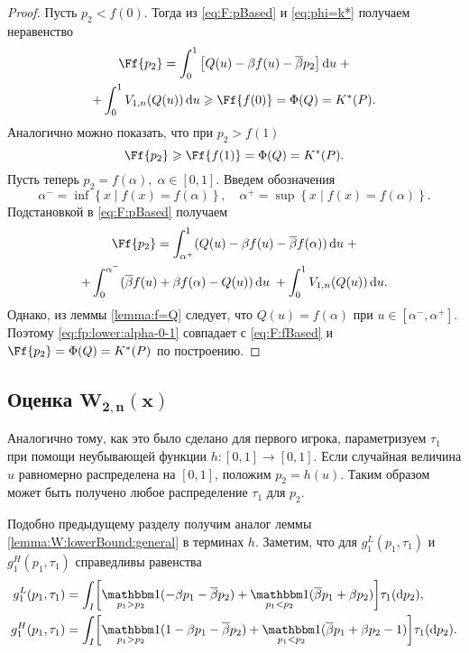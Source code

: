 {\begin{proof}
  Пусть $p_2 < f(0)$.
  Тогда из \eqref{eq:F:pBased} и \eqref{eq:phi=k*} получаем неравенство
  \begin{multline*}
    \Ff{p_2} = \int_0^1 \left[ Q(u) - \Co f(u) - \DCo p_2
    \right] \di u \; + \\
    + \int_0^1 V_{1,n}(Q(u)) \di u \geqslant \Ff{f(0)} = \Phi(Q) = K^*(P).
  \end{multline*}
  Аналогично можно показать, что при $p_2 > f(1)$
  \begin{equation*}
    \Ff{p_2} \geqslant \Ff{f(1)} = \Phi(Q) = K^*(P).
  \end{equation*}
  Пусть теперь $p_2 = f(\alpha), \; \alpha \in [0, 1]$. Введем обозначения
  \[
    \alpha^- = \inf \left\{ x \;|\; f(x) = f(\alpha) \right\}, \quad \alpha^+ =
    \sup \left\{ x \;|\; f(x) = f(\alpha) \right\}.
  \]
  Подстановкой в \eqref{eq:F:pBased} получаем
  \begin{multline}\label{eq:fp:lower:alpha-0-1}
    \Ff{p_2} =
    \int_{\alpha^+}^1  (Q(u) - \Co f(u) - \DCo f(\alpha)) \di u \; + \\
    + \int_0^{\alpha^-} (\DCo f(u) + \Co f(\alpha) - Q(u)) \di u \; + \int_0^1
    V_{1,n}(Q(u)) \di u.
  \end{multline}
  Однако, из леммы \ref{lemma:f=Q} следует, что $Q(u) = f(\alpha)$ при $u \in [\alpha^-, \alpha^+]$.
  Поэтому \eqref{eq:fp:lower:alpha-0-1} совпадает с \eqref{eq:F:fBased} и $\Ff{p_2} = \Phi(Q) = K^*(P)$ по построению.
\end{proof}

\subsection{Оценка $\mathbf{W_{2,n}\left(x\right)}$}\label{sec:-dual-game-estimate}
Аналогично тому, как это было сделано для первого игрока, параметризуем $\tau_1$ при помощи неубывающей функции $h: [0, 1] \rightarrow [0, 1]$.
Если случайная величина $u$ равномерно распределена на $[0, 1]$, положим $p_2 = h(u)$.
Таким образом может быть получено любое распределение $\tau_1$ для $p_2$.

Подобно предыдущему разделу получим аналог леммы \ref{lemma:W:lowerBound:general} в терминах $h$.
Заметим, что для $g_1^L(p_1, \tau_1)$ и $g_1^H(p_1, \tau_1)$ справедливы равенства
\begin{align*}
  g_1^L(p_1,\tau_1) &=
                      \int_I \biggl[
                      \Ind_{p_1>p_2} (-\Co p_1 - \DCo p_2) +
                      \Ind_{p_1<p_2} (\DCo p_1 + \Co p_2)
                      \biggr] \tau_1(\di p_2),\\
  g_1^H(p_1,\tau_1) &=
                      \int_I \biggl[
                      \Ind_{p_1>p_2} (1 -\Co p_1 - \DCo p_2) +
                      \Ind_{p_1<p_2} (\DCo p_1 + \Co p_2 - 1)
                      \biggr] \tau_1(\di p_2).
\end{align*}

}
